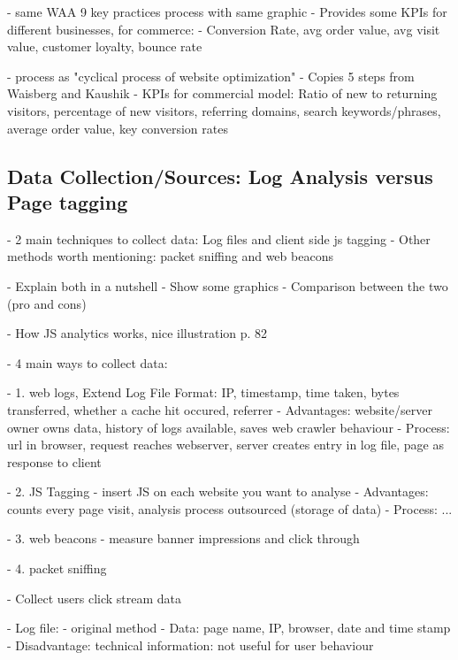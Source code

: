 - same WAA 9 key practices process with same graphic
- Provides some KPIs for different businesses, for commerce:
- Conversion Rate, avg order value, avg visit value, customer loyalty, bounce rate 



- process as "cyclical process of website optimization"
- Copies 5 steps from Waisberg and Kaushik
- KPIs for commercial model: Ratio of new to returning visitors, percentage of new visitors, referring domains, search keywords/phrases, average order value, key conversion rates








\subsection{Data Collection/Sources: Log Analysis versus Page tagging}


- 2 main techniques to collect data: Log files and client side js tagging
- Other methods worth mentioning: packet sniffing and web beacons

- Explain both in a nutshell
- Show some graphics
- Comparison between the two (pro and cons)




- How JS analytics works, nice illustration p. 82


- 4 main ways to collect data:

- 1. web logs, Extend Log File Format: IP, timestamp, time taken, bytes transferred, whether a cache hit occured, referrer
- Advantages: website/server owner owns data, history of logs available, saves web crawler behaviour
- Process: url in browser, request reaches webserver, server creates entry in log file, page as response to client

- 2.  JS Tagging
- insert JS on each website you want to analyse
- Advantages: counts every page visit, analysis process outsourced (storage of data)
- Process: ...

- 3. web beacons
- measure banner impressions and click through

- 4. packet sniffing



- Collect users click stream data

- Log file:
- original method
- Data: page name, IP, browser, date and time stamp
- Disadvantage: technical information: not useful for user behaviour

